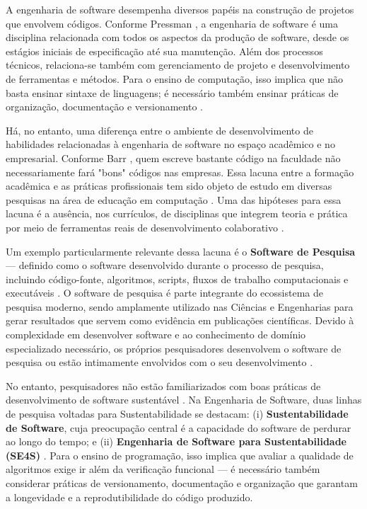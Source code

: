 \documentclass[english, spanish, brazilian]{RBIEarticle}
\begin{document}
A engenharia de software desempenha diversos papéis na construção de projetos que envolvem códigos. Conforme Pressman \cite{pressman2016}, a engenharia de software é uma disciplina relacionada com todos os aspectos da produção de software, desde os estágios iniciais de especificação até sua manutenção. Além dos processos técnicos, relaciona-se também com gerenciamento de projeto e desenvolvimento de ferramentas e métodos. Para o ensino de computação, isso implica que não basta ensinar sintaxe de linguagens; é necessário também ensinar práticas de organização, documentação e versionamento \cite{sommerville2011}.

Há, no entanto, uma diferença entre o ambiente de desenvolvimento de habilidades relacionadas à engenharia de software no espaço acadêmico e no empresarial. Conforme Barr \cite{barr2018}, quem escreve bastante código na faculdade não necessariamente fará "bons" códigos nas empresas. Essa lacuna entre a formação acadêmica e as práticas profissionais tem sido objeto de estudo em diversas pesquisas na área de educação em computação \cite{qian2017}. Uma das hipóteses para essa lacuna é a ausência, nos currículos, de disciplinas que integrem teoria e prática por meio de ferramentas reais de desenvolvimento colaborativo \cite{arcuri2020}.

Um exemplo particularmente relevante dessa lacuna é o \textbf{Software de Pesquisa} — definido como o software desenvolvido durante o processo de pesquisa, incluindo código-fonte, algoritmos, scripts, fluxos de trabalho computacionais e executáveis \cite{vonflach2023}. O software de pesquisa é parte integrante do ecossistema de pesquisa moderno, sendo amplamente utilizado nas Ciências e Engenharias para gerar resultados que servem como evidência em publicações científicas. Devido à complexidade em desenvolver software e ao conhecimento de domínio especializado necessário, os próprios pesquisadores desenvolvem o software de pesquisa ou estão intimamente envolvidos com o seu desenvolvimento \cite{carver2007}.

No entanto, pesquisadores não estão familiarizados com boas práticas de desenvolvimento de software sustentável \cite{vonflach2023}. Na Engenharia de Software, duas linhas de pesquisa voltadas para Sustentabilidade se destacam: (i) \textbf{Sustentabilidade de Software}, cuja preocupação central é a capacidade do software de perdurar ao longo do tempo; e (ii) \textbf{Engenharia de Software para Sustentabilidade (SE4S)} \cite{venters2021}. Para o ensino de programação, isso implica que avaliar a qualidade de algoritmos exige ir além da verificação funcional — é necessário também considerar práticas de versionamento, documentação e organização que garantam a longevidade e a reprodutibilidade do código produzido.
\end{document}
